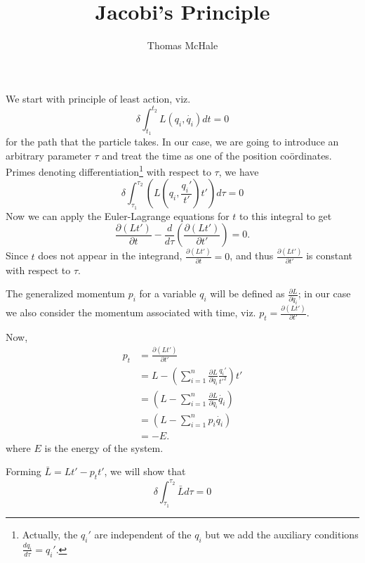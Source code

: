 \documentclass{article}
\begin{document}
\title{Jacobi's Principle}
\author{Thomas McHale}
\maketitle
We start with principle of least action, viz.
\begin{equation}
\delta\int_{t_1}^{t_2}L(q_i,\dot{q_i})dt=0
\end{equation}
for the path that the particle takes. In our case, we are going to introduce an arbitrary parameter $\tau$ and treat the time as one of the position co\"ordinates. Primes denoting differentiation\footnote{Actually, the $q_i'$ are independent of the $q_i$ but we add the auxiliary conditions $\frac{dq_i}{d\tau}=q_i'$.} with respect to $\tau$, we have
\begin{equation}
\delta\int_{\tau_1}^{\tau_2}\left(L\left(q_i,\frac{q_i'}{t'}\right)t'\right)d\tau=0
\end{equation}
Now we can apply the Euler-Lagrange equations for $t$ to this integral to get
\begin{equation}
\frac{\partial(Lt')}{\partial t}-\frac{d}{d\tau}\left(\frac{\partial(Lt')}{\partial t'}\right)=0.
\end{equation}
Since $t$ does not appear in the integrand, $\displaystyle\frac{\partial(Lt')}{\partial t}=0$, and thus $\displaystyle\frac{\partial(Lt')}{\partial t'}$ is constant with respect to $\tau$.

The generalized momentum $p_i$ for a variable $q_i$ will be defined as $\displaystyle\frac{\partial L}{\partial\dot{q_i}}$; in our case we also consider the momentum associated with time, viz. $\displaystyle p_t=\frac{\partial(Lt')}{\partial t'}.$

Now,
\begin{align*}
p_t&=\frac{\partial(Lt')}{\partial t'}\\
&=L-\left(\sum_{i=1}^n\frac{\partial L}{\partial\dot{q_i}}\frac{q_i'}{t'^2}\right)t'\\
&=\left(L-\sum_{i=1}^n\frac{\partial L}{\partial\dot{q_i}}\dot{q_i}\right)\\
&=\left(L-\sum_{i=1}^n p_i\dot{q_i}\right)\\
&=-E.
\end{align*}
where $E$ is the energy of the system.

Forming $\bar{L}=Lt'-p_tt'$, we will show that
\begin{equation}
\delta\int_{\tau_1}^{\tau_2}\bar{L}d\tau=0
\end{equation}
\end{document}
